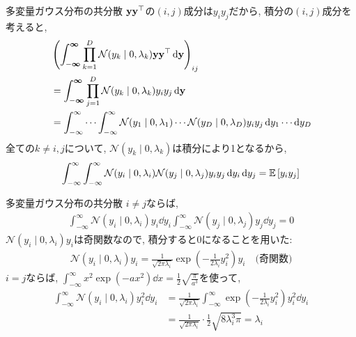 \documentclass[dvipdfmx,notheorems,t]{beamer}
\begin{document}
\begin{frame}{多変量ガウス分布の共分散}
$\vb{y} \vb{y}^\top$の$(i, j)$成分は$y_i y_j$だから, 積分の$(i, j)$成分を考えると,
\begin{align*}
  & \left( \int_{-\boldsymbol{\infty}}^{\boldsymbol{\infty}}
    \prod_{k = 1}^D \mathcal{N}(y_k \mid 0, \lambda_k)
    \vb{y} \vb{y}^\top \dd{\vb{y}} \right)_{ij} \\
  &= \int_{-\boldsymbol{\infty}}^{\boldsymbol{\infty}}
    \prod_{j = 1}^D \mathcal{N}(y_k \mid 0, \lambda_k)
    y_i y_j \dd{\vb{y}} \\
  &= \int_{-\infty}^\infty \cdots \int_{-\infty}^\infty
    \mathcal{N}(y_1 \mid 0, \lambda_1) \cdots \mathcal{N}(y_D \mid 0, \lambda_D)
    y_i y_j \dd{y_1} \cdots \dd{y_D}
\end{align*}
全ての$k \neq i, j$について, $\mathcal{N}(y_k \mid 0, \lambda_k)$は積分により1となるから,
\begin{align*}
  \int_{-\infty}^\infty \int_{-\infty}^\infty
    \mathcal{N}(y_i \mid 0, \lambda_i) \mathcal{N}(y_j \mid 0, \lambda_j)
    y_i y_j \dd{y_i} \dd{y_j} = \operatorname{\mathbb{E}} \left[ y_i y_j \right]
\end{align*}
\end{frame}

\begin{frame}{多変量ガウス分布の共分散}
$i \neq j$ならば,
\begin{align*}
  \int_{-\infty}^\infty \mathcal{N}(y_i \mid 0, \lambda_i) y_i \dd{y_i}
    \int_{-\infty}^\infty \mathcal{N}(y_j \mid 0, \lambda_j) y_j \dd{y_j} = 0
\end{align*}
$\mathcal{N}(y_i \mid 0, \lambda_i) y_i$は奇関数なので, 積分すると0になることを用いた:
\begin{align*}
  \mathcal{N}(y_i \mid 0, \lambda_i) y_i =
    \frac{1}{\sqrt{2\pi \lambda_i}}
    \exp(-\frac{1}{2 \lambda_i} y_i^2) y_i \quad \text{(奇関数)}
\end{align*}
$i = j$ならば, $\int_{-\infty}^\infty x^2 \exp(-a x^2) \dd{x} = \frac{1}{2} \sqrt{\frac{\pi}{a^3}}$を使って,
\begin{align*}
  \int_{-\infty}^\infty \mathcal{N}(y_i \mid 0, \lambda_i) y_i^2 \dd{y_i}
  &= \frac{1}{\sqrt{2\pi \lambda_i}} \int_{-\infty}^\infty
    \exp(-\frac{1}{2 \lambda_i} y_i^2) y_i^2 \dd{y_i} \\
  &= \frac{1}{\sqrt{2\pi \lambda_i}}
    \cdot \frac{1}{2} \sqrt{8 \lambda_i^3 \pi}
  = \lambda_i
\end{align*}
\end{frame}
\end{document}
